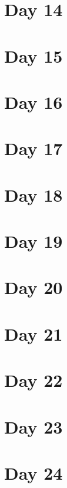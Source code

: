 \documentclass[]{book}
\begin{document}
\hypertarget{day-14}{%
\chapter{Day 14}\label{day-14}}

\hypertarget{day-15}{%
\chapter{Day 15}\label{day-15}}

\hypertarget{day-16}{%
\chapter{Day 16}\label{day-16}}

\hypertarget{day-17}{%
\chapter{Day 17}\label{day-17}}

\hypertarget{day-18}{%
\chapter{Day 18}\label{day-18}}

\hypertarget{day-19}{%
\chapter{Day 19}\label{day-19}}

\hypertarget{day-20}{%
\chapter{Day 20}\label{day-20}}

\hypertarget{day-21}{%
\chapter{Day 21}\label{day-21}}

\hypertarget{day-22}{%
\chapter{Day 22}\label{day-22}}

\hypertarget{day-23}{%
\chapter{Day 23}\label{day-23}}

\hypertarget{day-24}{%
\chapter{Day 24}\label{day-24}}
\end{document}
